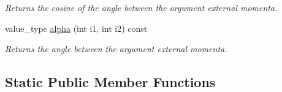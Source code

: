 \begin{DoxyCompactItemize}
\begin{DoxyCompactList}\small\item\em Returns the cosine of the angle between the argument external momenta. \end{DoxyCompactList}\item 
\hypertarget{a00451_a3d3dfd9f1aed794d5c6b57b877de5beb}{}value\+\_\+type \hyperlink{a00451_a3d3dfd9f1aed794d5c6b57b877de5beb}{alpha} (int i1, int i2) const \label{a00451_a3d3dfd9f1aed794d5c6b57b877de5beb}

\begin{DoxyCompactList}\small\item\em Returns the angle between the argument external momenta. \end{DoxyCompactList}\end{DoxyCompactItemize}
\subsection*{Static Public Member Functions}
